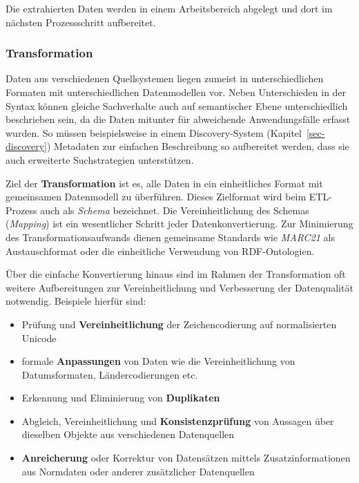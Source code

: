 \documentclass[
  11pt,
  letterpaper,
  DIV=11,
  twoside]{scrreprt}
\begin{document}
Die extrahierten Daten werden in einem Arbeitsbereich abgelegt und dort
im nächsten Prozessschritt aufbereitet.

\subsubsection{Transformation}\label{transformation}

Daten aus verschiedenen Quellsystemen liegen zumeist in
unterschiedlichen Formaten mit unterschiedlichen Datenmodellen vor.
Neben Unterschieden in der Syntax können gleiche Sachverhalte auch auf
semantischer Ebene unterschiedlich beschrieben sein, da die Daten
mitunter für abweichende Anwendungsfälle erfasst wurden. So müssen
beispielsweise in einem Discovery-System (Kapitel~\ref{sec-discovery})
Metadaten zur einfachen Beschreibung so aufbereitet werden, dass sie
auch erweiterte Suchstrategien unterstützen.

Ziel der \textbf{Transformation} ist es, alle Daten in ein einheitliches
Format mit gemeinsamen Datenmodell zu überführen. Dieses Zielformat wird
beim ETL-Prozess auch als \emph{Schema} bezeichnet. Die
Vereinheitlichung des Schemas (\emph{Mapping}) ist ein wesentlicher
Schritt jeder Datenkonvertierung. Zur Minimierung des
Transformationsaufwands dienen gemeinsame Standards wie \emph{MARC21}
als Austauschformat oder die einheitliche Verwendung von RDF-Ontologien.

Über die einfache Konvertierung hinaus sind im Rahmen der Transformation
oft weitere Aufbereitungen zur Vereinheitlichung und Verbesserung der
Datenqualität notwendig. Beispiele hierfür sind:

\begin{itemize}
\item
  Prüfung und \textbf{Vereinheitlichung} der Zeichencodierung auf
  normalisierten Unicode
\item
  formale \textbf{Anpassungen} von Daten wie die Vereinheitlichung von
  Datumsformaten, Ländercodierungen etc.
\item
  Erkennung und Eliminierung von \textbf{Duplikaten}
\item
  Abgleich, Vereinheitlichung und \textbf{Konsistenzprüfung} von
  Aussagen über dieselben Objekte aus verschiedenen Datenquellen
\item
  \textbf{Anreicherung} oder Korrektur von Datensätzen mittels
  Zusatzinformationen aus Normdaten oder anderer zusätzlicher
  Datenquellen
\end{itemize}
\end{document}
